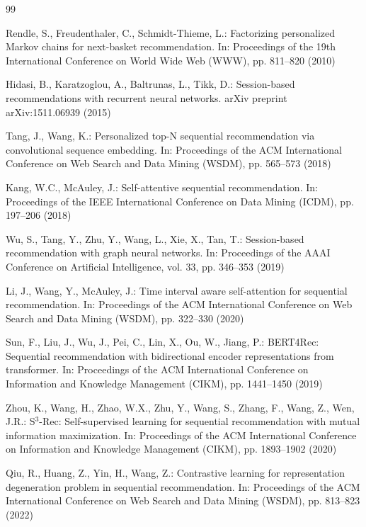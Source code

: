 \documentclass[runningheads,a4paper]{llncs}
\begin{document}
\begin{thebibliography}{99}

Rendle, S., Freudenthaler, C., Schmidt-Thieme, L.: Factorizing personalized Markov chains for next-basket recommendation. In: Proceedings of the 19th International Conference on World Wide Web (WWW), pp. 811--820 (2010)

Hidasi, B., Karatzoglou, A., Baltrunas, L., Tikk, D.: Session-based recommendations with recurrent neural networks. arXiv preprint arXiv:1511.06939 (2015)

Tang, J., Wang, K.: Personalized top-N sequential recommendation via convolutional sequence embedding. In: Proceedings of the ACM International Conference on Web Search and Data Mining (WSDM), pp. 565--573 (2018)

Kang, W.C., McAuley, J.: Self-attentive sequential recommendation. In: Proceedings of the IEEE International Conference on Data Mining (ICDM), pp. 197--206 (2018)

Wu, S., Tang, Y., Zhu, Y., Wang, L., Xie, X., Tan, T.: Session-based recommendation with graph neural networks. In: Proceedings of the AAAI Conference on Artificial Intelligence, vol. 33, pp. 346--353 (2019)

Li, J., Wang, Y., McAuley, J.: Time interval aware self-attention for sequential recommendation. In: Proceedings of the ACM International Conference on Web Search and Data Mining (WSDM), pp. 322--330 (2020)

Sun, F., Liu, J., Wu, J., Pei, C., Lin, X., Ou, W., Jiang, P.: BERT4Rec: Sequential recommendation with bidirectional encoder representations from transformer. In: Proceedings of the ACM International Conference on Information and Knowledge Management (CIKM), pp. 1441--1450 (2019)

Zhou, K., Wang, H., Zhao, W.X., Zhu, Y., Wang, S., Zhang, F., Wang, Z., Wen, J.R.: S$^3$-Rec: Self-supervised learning for sequential recommendation with mutual information maximization. In: Proceedings of the ACM International Conference on Information and Knowledge Management (CIKM), pp. 1893--1902 (2020)

Qiu, R., Huang, Z., Yin, H., Wang, Z.: Contrastive learning for representation degeneration problem in sequential recommendation. In: Proceedings of the ACM International Conference on Web Search and Data Mining (WSDM), pp. 813--823 (2022)


\end{thebibliography}
\end{document}
